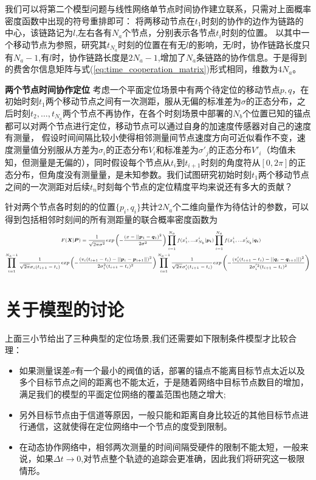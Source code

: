 我们可以将第二个模型问题与线性网络单节点时间协作建立联系，只需对上面概率密度函数中出现的符号重排即可：
将两移动节点在$t_1$时刻的协作的边作为链路的中心，该链路记为$l$,左右各有$N_a$个节点，分别表示各节点$t_i$时刻的位置。
以其中一个移动节点为参照，研究其$t_{N_a}$时刻的位置在有无$l$的影响，无$l$时，协作链路长度只有$N_a-1$,有$l$时，协作链路长度是$2N_a-1$,增加了$N_a$条链路的协作信息。于是得到的费舍尔信息矩阵与式(\ref{eq:time_cooperation_matrix})形式相同，维数为$4N_a$。

\textbf{两个节点时间协作定位}
考虑一个平面定位场景中有两个待定位的移动节点$p,q$，在初始时刻$t_1$两个移动节点之间有一次测距，服从无偏的标准差为$\sigma$的正态分布，之后时刻$t_2,\dots,t_{N_a}$两个节点不再协作，在各个时刻场景中部署的$N_b$个位置已知的锚点都可以对两个节点进行定位，移动节点可以通过自身的加速度传感器对自己的速度有测量，
假设时间间隔比较小使得相邻测量间节点速度方向可近似看作不变，速度测量值分别服从方差为$\sigma_i$的正态分布$V_i$和标准差为$\sigma'_j$的正态分布$V'_i$（均值未知，但测量是无偏的），同时假设每个节点从$t_i$到$t_{i+1}$时刻的角度符从$[0,2\pi]$的正态分布，但角度没有测量量，是未知参数。我们试图研究初始时刻$t_1$两个移动节点之间的一次测距对后续$t_n$时刻每个节点的定位精度平均来说还有多大的贡献？

针对两个节点各时刻的的位置$\{p_i,q_i\}$共计$2N_a$个二维向量作为待估计的参数，可以得到包括相邻时刻间的所有测距量的联合概率密度函数为
\begin{equation}
\scriptsize{
\begin{split}
&F(\bm{X}|\bm{P})=\frac{1}{\sqrt{2\pi\sigma^2}}exp\left(-\frac{(x-||\bm{p}_1-\bm{q}_1)^2}{2\sigma^2}\right)\prod_{i=1}^{N_a}
f(x^i_1,...x^{i}_{N_b}|\bm{p_i})
\prod_{i=1}^{N_a} f(x^i_1,...x^{i}_{N_b}|\bm{q_i})\\
\prod_{i=1}^{N_a-1}\frac{1}{\sqrt{2\pi}\sigma_i(t_{i+1}-t_i)}
&exp\left(-\frac{(v_i(t_{i+1}-t_i)-||\bm{p}_i-\bm{p}_{i+1}||)^2}{2\sigma_i^2(t_{i+1}-t_i)^2}\right)
\prod_{i=1}^{N_a-1}\frac{1}{\sqrt{2\pi}\sigma'_i(t_{i+1}-t_i)}
exp\left(-\frac{(v'_i(t_{i+1}-t_i)-||\bm{q}_i-\bm{q}_{i+1}||)^2}{2\sigma^{'2}_i(t_{i+1}-t_i)^2}\right)
\end{split}}
\end{equation}
\section{关于模型的讨论}\label{section:model_discussion}
上面三小节给出了三种典型的定位场景,我们还需要如下限制条件模型才比较合理：
\begin{itemize}
  \item 如果测量误差$\sigma$有一个最小的阀值的话，部署的锚点不能离目标节点太近以及多个目标节点之间的距离也不能太近，于是随着网络中目标节点数目的增加，满足我们的模型的平面定位网络的覆盖范围也随之增大;
  \item 另外目标节点由于信道等原因，一般只能和距离自身比较近的其他目标节点进行通信，这就使得在定位网络中一个节点的度受到限制。
  \item 在动态协作网络中，相邻两次测量的时间间隔受硬件的限制不能太短，一般来说，如果$\Delta t \to 0$,对节点整个轨迹的追踪会更准确，因此我们将研究这一极限情形。
\end{itemize}
